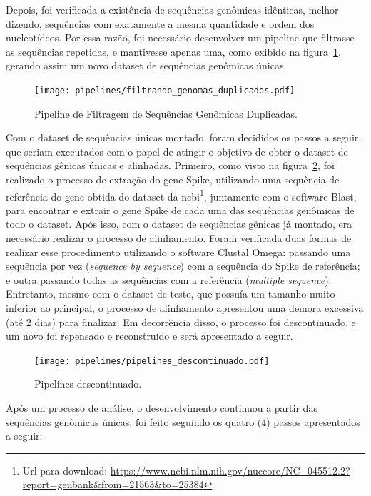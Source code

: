 Depois, foi verificada a existência de sequências genômicas idênticas, melhor dizendo, sequências com exatamente a mesma quantidade e ordem dos nucleotídeos. Por essa razão, foi necessário desenvolver um pipeline que filtrasse as sequências repetidas, e mantivesse apenas uma, como exibido na figura~\ref{fig:pipelineGenomicasDuplicadas}, gerando assim um novo dataset de sequências genômicas únicas.

\begin{figure}[htb]
  \centering
  \caption{Pipeline de Filtragem de Sequências Genômicas Duplicadas.}
  \texttt{[image: pipelines/filtrando\_genomas\_duplicados.pdf]}
  ~\label{fig:pipelineGenomicasDuplicadas}
\end{figure}

Com o dataset de sequências únicas montado, foram decididos os passos a seguir, que seriam executados com o papel de atingir o objetivo de obter o dataset de sequências gênicas únicas e alinhadas. Primeiro, como visto na figura~\ref{fig:pipelinesDescontinuados}, foi realizado o processo de extração do gene Spike, utilizando uma sequência de referência do gene obtida do dataset da \gls{ncbi}\footnote{Url para download: \url{https://www.ncbi.nlm.nih.gov/nuccore/NC_045512.2?report=genbank&from=21563&to=25384}}, juntamente com o software Blast, para encontrar e extrair o gene Spike de cada uma das sequências genômicas de todo o dataset. Após isso, com o dataset de sequências gênicas já montado, era necessário realizar o processo de alinhamento. Foram verificada duas formas de realizar esse procedimento utilizando o software Clustal Omega: passando uma sequência por vez (\textit{sequence by sequence}) com a sequência do Spike de referência; e outra passando todas as sequências com a referência (\textit{multiple sequence}). Entretanto, mesmo com o dataset de teste, que possuía um tamanho muito inferior ao principal, o processo de alinhamento apresentou uma demora excessiva (até 2 dias) para finalizar. Em decorrência disso, o processo foi descontinuado, e um novo foi repensado e reconstruído e será apresentado a seguir.

\begin{figure}[htb]
  \centering
  \caption{Pipelines descontinuado.}
  \texttt{[image: pipelines/pipelines\_descontinuado.pdf]}
  ~\label{fig:pipelinesDescontinuados}
\end{figure}

Após um processo de análise, o desenvolvimento continuou a partir das sequências genômicas únicas, foi feito seguindo os quatro (4) passos apresentados a seguir:

